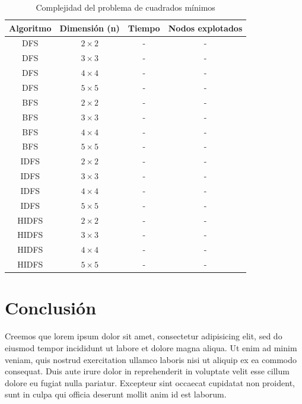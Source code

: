 \documentclass[%
	final,
	reprint,
	notitlepage,
	narroweqnarray,
	inline,
	twoside,
	invited
	]{ieee}
\begin{document}
\begin{table}[H]
\begin{center}
\begin{tabular}{|c|c|c|c|}
\hline
Algoritmo & Dimensión (n) & Tiempo & Nodos explotados\\
\hline
\hline

DFS & $2\times2$ & - & -\\
DFS & $3\times3$ & - & -\\
DFS & $4\times4$ & - & -\\
DFS & $5\times5$ & - & -\\
\hline
BFS & $2\times2$ & - & -\\
BFS & $3\times3$ & - & -\\
BFS & $4\times4$ & - & -\\
BFS & $5\times5$ & - & -\\
\hline
IDFS & $2\times2$ & - & -\\
IDFS & $3\times3$ & - & -\\
IDFS & $4\times4$ & - & -\\
IDFS & $5\times5$ & - & -\\
\hline
HIDFS & $2\times2$ & - & -\\
HIDFS & $3\times3$ & - & -\\
HIDFS & $4\times4$ & - & -\\
HIDFS & $5\times5$ & - & -\\

\hline  
\end{tabular}
\end{center}
\caption{Complejidad del problema de cuadrados mínimos}
\label{tmedio}
\end{table}

\section{Conclusión}

\PARstart Creemos que lorem ipsum dolor sit amet, consectetur adipisicing elit, sed do eiusmod tempor incididunt ut labore et dolore magna aliqua. Ut enim ad minim veniam, quis nostrud exercitation ullamco laboris nisi ut aliquip ex ea commodo consequat. Duis aute irure dolor in reprehenderit in voluptate velit esse cillum dolore eu fugiat nulla pariatur. Excepteur sint occaecat cupidatat non proident, sunt in culpa qui officia deserunt mollit anim id est laborum.
\end{document}
